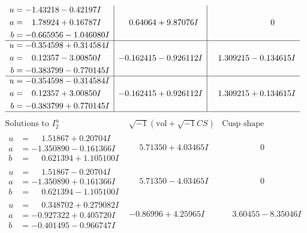 \documentclass[1p]{elsarticle_modified}
\theoremstyle{definition}
\newcommand{\I}{\sqrt{-1}}
\begin{document}
$$\begin{array}{c|c|c}
\begin{aligned}
u &= -1.43218 - 0.42197 I \\
a &= \phantom{-}1.78924 + 0.16787 I \\
b &= -0.665956 - 1.046080 I\end{aligned}
 & \phantom{-}0.64064 + 9.87076 I & \phantom{-0.000000 } 0 \\ \hline\begin{aligned}
u &= -0.354598 + 0.314584 I \\
a &= \phantom{-}0.12357 - 3.00850 I \\
b &= -0.383799 - 0.770145 I\end{aligned}
 & -0.162415 - 0.926112 I & \phantom{-}1.309215 - 0.134615 I \\ \hline\begin{aligned}
u &= -0.354598 - 0.314584 I \\
a &= \phantom{-}0.12357 + 3.00850 I \\
b &= -0.383799 + 0.770145 I\end{aligned}
 & -0.162415 + 0.926112 I & \phantom{-}1.309215 + 0.134615 I\\
 \hline 
 \end{array}$$\newpage$$\begin{array}{c|c|c}  
\text{Solutions to }I^u_{2}& \I (\text{vol} + \sqrt{-1}CS) & \text{Cusp shape}\\
 \hline 
\begin{aligned}
u &= \phantom{-}1.51867 + 0.20704 I \\
a &= -1.350890 - 0.161366 I \\
b &= \phantom{-}0.621394 + 1.105100 I\end{aligned}
 & \phantom{-}5.71350 + 4.03465 I & \phantom{-0.000000 } 0 \\ \hline\begin{aligned}
u &= \phantom{-}1.51867 - 0.20704 I \\
a &= -1.350890 + 0.161366 I \\
b &= \phantom{-}0.621394 - 1.105100 I\end{aligned}
 & \phantom{-}5.71350 - 4.03465 I & \phantom{-0.000000 } 0 \\ \hline\begin{aligned}
u &= \phantom{-}0.348702 + 0.279082 I \\
a &= -0.927322 + 0.405720 I \\
b &= -0.401495 - 0.966747 I\end{aligned}
 & -0.86996 + 4.25965 I & \phantom{-}3.60455 - 8.35046 I \\ \hline\begin{aligned}

\end{aligned}
\end{array}$$
\end{document}

